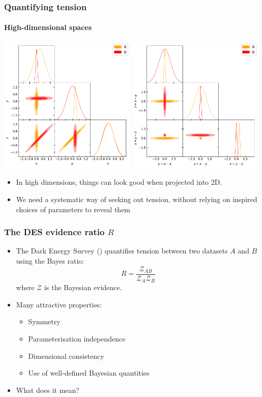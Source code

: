 \documentclass[%
]{beamer}
\begin{document}
\begin{frame}
    \frametitle{Quantifying tension}
    \framesubtitle{High-dimensional spaces}
    \centerline{%
    \includegraphics[width=0.49\textwidth]{./figures/tension.pdf}
    \includegraphics[width=0.49\textwidth]{./figures/tension_rotated.pdf}
    }
    \begin{itemize}
        \item In high dimensions, things can look good when projected into 2D.
        \item We need a systematic way of seeking out tension, without relying on inspired choices of parameters to reveal them
    \end{itemize}

\end{frame}

\begin{frame}
    \frametitle{The DES evidence ratio $R$}
    \begin{itemize}
        \item The Dark Energy Survey () quantifies tension between two datasets $A$ and $B$ using the Bayes ratio:
            \[
                R = \frac{\mathcal{Z}_{AB}}{\mathcal{Z}_A \mathcal{Z}_B}
            \]
            where $\mathcal{Z}$ is the Bayesian evidence.
        \item Many attractive properties:
            \begin{itemize}
                \item Symmetry
                \item Parameterisation independence
                \item Dimensional consistency
                \item Use of well-defined Bayesian quantities
            \end{itemize}
        \item What does it mean?
    \end{itemize}
\end{frame}
\end{document}
